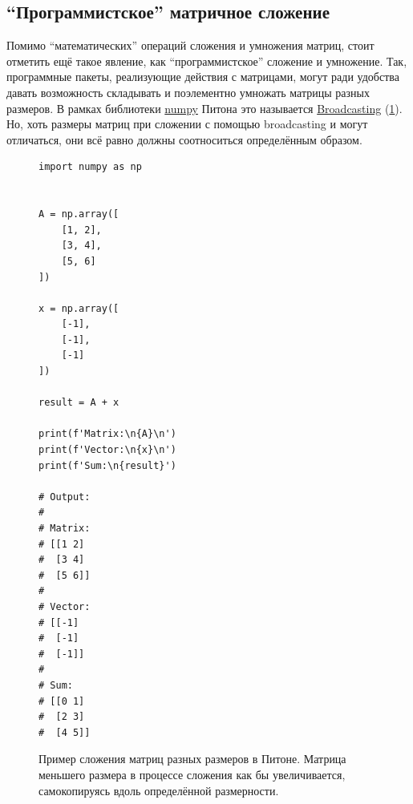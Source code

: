 \documentclass[a4paper,12pt]{article}
\begin{document}
  
  \subsection{``Программистское'' матричное сложение}
  
  Помимо ``математических'' операций сложения и умножения матриц, стоит отметить ещё такое явление, как ``программистское'' сложение и умножение.
  Так, программные пакеты, реализующие действия с матрицами, могут ради удобства давать возможность складывать и поэлементно умножать матрицы разных размеров.
  В рамках библиотеки \href{https://numpy.org/}{numpy} Питона это называется \href{https://numpy.org/doc/stable/user/basics.broadcasting.html}{Broadcasting} (\ref{fig:broadcasting-example}).
  Но, хоть размеры матриц при сложении с помощью broadcasting и могут отличаться, они всё равно должны соотноситься определённым образом.
  
  \begin{figure}[p]
    \begin{verbatim}
import numpy as np


A = np.array([
    [1, 2],
    [3, 4],
    [5, 6]
])

x = np.array([
    [-1],
    [-1],
    [-1]
])

result = A + x

print(f'Matrix:\n{A}\n')
print(f'Vector:\n{x}\n')
print(f'Sum:\n{result}')

# Output:
#
# Matrix:
# [[1 2]
#  [3 4]
#  [5 6]]
#
# Vector:
# [[-1]
#  [-1]
#  [-1]]
#
# Sum:
# [[0 1]
#  [2 3]
#  [4 5]]
    \end{verbatim}

    \caption{Пример сложения матриц разных размеров в Питоне. Матрица меньшего размера в процессе сложения как бы увеличивается, самокопируясь вдоль определённой размерности.}
    \label{fig:broadcasting-example}
  \end{figure}
\end{document}
